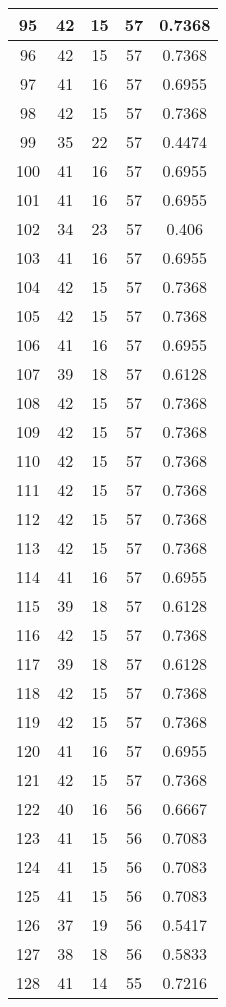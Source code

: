 \documentclass[letterpaper, 12pt]{article}
\begin{document}
\begin{longtable}{|c|c|c|c|c|}
\hline
95 & 42 & 15 & 57 & 0.7368 \\
\hline
96 & 42 & 15 & 57 & 0.7368 \\
\hline
97 & 41 & 16 & 57 & 0.6955 \\
\hline
98 & 42 & 15 & 57 & 0.7368 \\
\hline
99 & 35 & 22 & 57 & 0.4474 \\
\hline
100 & 41 & 16 & 57 & 0.6955 \\
\hline
101 & 41 & 16 & 57 & 0.6955 \\
\hline
102 & 34 & 23 & 57 & 0.406 \\
\hline
103 & 41 & 16 & 57 & 0.6955 \\
\hline
104 & 42 & 15 & 57 & 0.7368 \\
\hline
105 & 42 & 15 & 57 & 0.7368 \\
\hline
106 & 41 & 16 & 57 & 0.6955 \\
\hline
107 & 39 & 18 & 57 & 0.6128 \\
\hline
108 & 42 & 15 & 57 & 0.7368 \\
\hline
109 & 42 & 15 & 57 & 0.7368 \\
\hline
110 & 42 & 15 & 57 & 0.7368 \\
\hline
111 & 42 & 15 & 57 & 0.7368 \\
\hline
112 & 42 & 15 & 57 & 0.7368 \\
\hline
113 & 42 & 15 & 57 & 0.7368 \\
\hline
114 & 41 & 16 & 57 & 0.6955 \\
\hline
115 & 39 & 18 & 57 & 0.6128 \\
\hline
116 & 42 & 15 & 57 & 0.7368 \\
\hline
117 & 39 & 18 & 57 & 0.6128 \\
\hline
118 & 42 & 15 & 57 & 0.7368 \\
\hline
119 & 42 & 15 & 57 & 0.7368 \\
\hline
120 & 41 & 16 & 57 & 0.6955 \\
\hline
121 & 42 & 15 & 57 & 0.7368 \\
\hline
122 & 40 & 16 & 56 & 0.6667 \\
\hline
123 & 41 & 15 & 56 & 0.7083 \\
\hline
124 & 41 & 15 & 56 & 0.7083 \\
\hline
125 & 41 & 15 & 56 & 0.7083 \\
\hline
126 & 37 & 19 & 56 & 0.5417 \\
\hline
127 & 38 & 18 & 56 & 0.5833 \\
\hline
128 & 41 & 14 & 55 & 0.7216 \\

\end{longtable}
\end{document}
